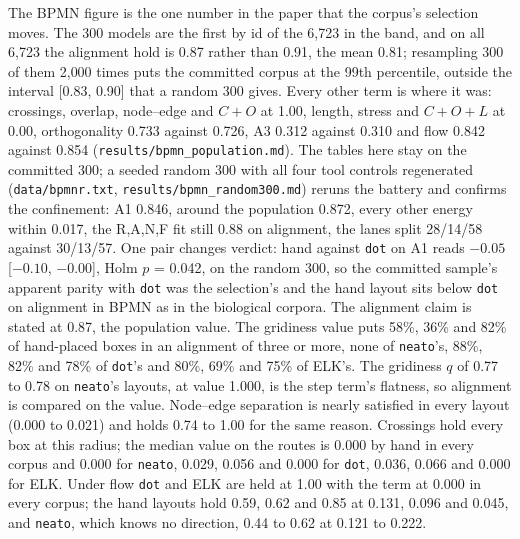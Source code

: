 \documentclass[11pt]{article}
\begin{document}
The BPMN figure is the one number in the paper that the corpus's selection moves. The 300
models are the first by id of the 6{,}723 in the band, and on all 6{,}723 the alignment hold
is 0.87 rather than 0.91, the mean 0.81; resampling 300 of them 2{,}000 times puts the committed corpus at
the 99th percentile, outside the interval [0.83, 0.90] that a random 300 gives. Every other
term is where it was: crossings, overlap, node--edge and $C{+}O$ at 1.00, length, stress and
$C{+}O{+}L$ at 0.00, orthogonality 0.733 against 0.726, A3 0.312 against 0.310 and flow
0.842 against 0.854 (\texttt{results/bpmn\_population.md}). The tables here stay on the
committed 300; a seeded random 300 with all four tool controls regenerated
(\texttt{data/bpmnr.txt}, \texttt{results/bpmn\_random300.md}) reruns the battery and
confirms the confinement: A1 0.846, around the population 0.872, every other energy
within 0.017, the R,A,N,F fit still 0.88 on alignment, the lanes split 28/14/58 against
30/13/57. One pair changes verdict: hand against \texttt{dot} on A1 reads $-0.05$
[$-0.10$, $-0.00$], Holm $p$ = 0.042, on the random 300, so the committed sample's
apparent parity with \texttt{dot} was the selection's and the hand layout sits below
\texttt{dot} on alignment in BPMN as in the biological corpora. The alignment claim is
stated at 0.87, the population value.
The gridiness value puts 58\%, 36\% and 82\% of hand-placed
boxes in an alignment of three or more, none of \texttt{neato}'s, 88\%, 82\% and 78\% of
\texttt{dot}'s and 80\%, 69\% and 75\% of ELK's. The gridiness $q$ of 0.77 to 0.78 on \texttt{neato}'s layouts, at value
1.000, is the step term's flatness, so alignment is compared on the value.
Node--edge separation is nearly satisfied in every layout (0.000 to 0.021) and holds 0.74
to 1.00 for the same reason. Crossings hold every box at this radius; the median value on
the routes is 0.000 by hand in every corpus and 0.000 for \texttt{neato}, 0.029, 0.056 and
0.000 for \texttt{dot}, 0.036, 0.066 and 0.000 for ELK. Under flow \texttt{dot} and ELK
are held at 1.00 with the term at 0.000 in every corpus; the hand layouts hold 0.59, 0.62
and 0.85 at 0.131, 0.096 and 0.045, and \texttt{neato}, which knows no direction, 0.44 to
0.62 at 0.121 to 0.222.
\end{document}
